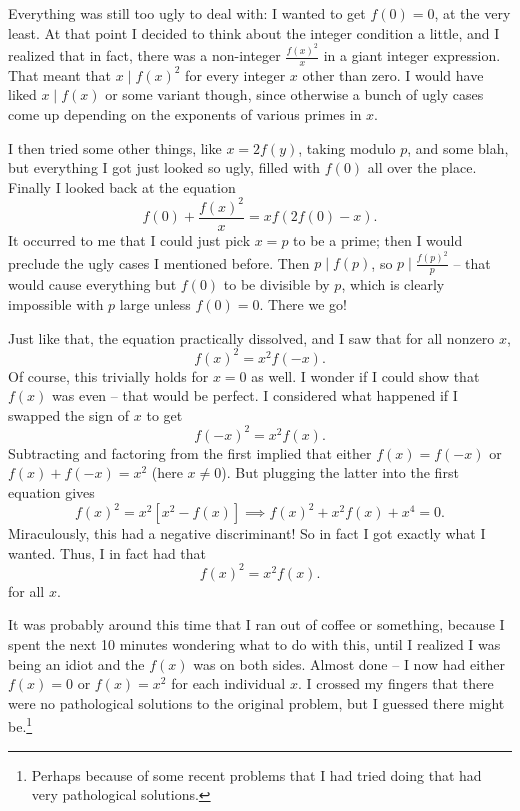 \documentclass[11pt]{scrartcl}
\begin{document}
Everything was still too ugly to deal with: I wanted to get $f(0) = 0$, at the very least.
At that point I decided to think about the integer condition a little, and I realized that in fact,
there was a non-integer $\frac{f(x)^2}{x}$ in a giant integer expression.
That meant that $x \mid f(x)^2$ for every integer $x$ other than zero.
I would have liked $x \mid f(x)$ or some variant though,
since otherwise a bunch of ugly cases come up depending on the exponents of various primes in $x$.

I then tried some other things, like $x=2f(y)$, taking modulo $p$, and some blah,
but everything I got just looked so ugly, filled with $f(0)$ all over the place.
Finally I looked back at the equation
\[ f(0) + \frac{f(x)^2}{x} = xf(2f(0)-x). \]
It occurred to me that I could just pick $x=p$ to be a prime;
then I would preclude the ugly cases I mentioned before.
Then $p \mid f(p)$, so $p \mid \frac{f(p)^2}{p}$ -- that would cause everything
but $f(0)$ to be divisible by $p$, which is clearly impossible with $p$ large unless $f(0) = 0$. There we go!

Just like that, the equation practically dissolved, and I saw that for all nonzero $x$,
\[ f(x)^2 = x^2 f(-x). \]
Of course, this trivially holds for $x=0$ as well.
I wonder if I could show that $f(x)$ was even -- that would be perfect.
I considered what happened if I swapped the sign of $x$ to get
\[ f(-x)^2 = x^2f(x). \]
Subtracting and factoring from the first implied that either $f(x) = f(-x)$ or
$f(x) + f(-x) = x^2$ (here $x \neq 0$). But plugging the latter into the first equation gives
\[ f(x)^2 = x^2 \left[ x^2 - f(x) \right] \implies f(x)^2 + x^2 f(x) + x^4 = 0. \]
Miraculously, this had a negative discriminant!
So in fact I got exactly what I wanted. Thus, I in fact had that
\[ f(x)^2 = x^2f(x). \]
for all $x$.

It was probably around this time that I ran out of coffee or something,
because I spent the next 10 minutes wondering what to do with this,
until I realized I was being an idiot and the $f(x)$ was on both sides.
Almost done -- I now had either $f(x) = 0$ or $f(x) = x^2$ for each individual $x$.
I crossed my fingers that there were no pathological solutions to the original problem,
but I guessed there might be.\footnote{Perhaps because of some recent problems
that I had tried doing that had very pathological solutions.}
\end{document}
